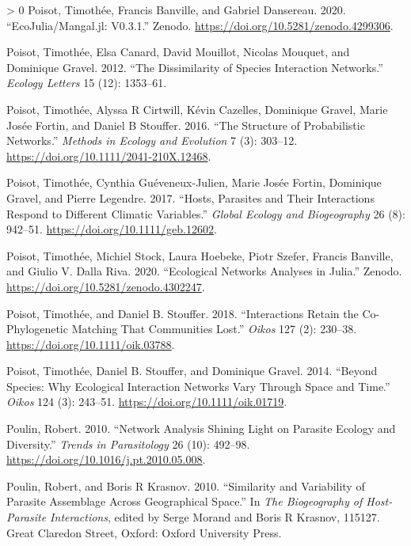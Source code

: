 \documentclass[11pt]{article}
\newlength{\cslhangindent}
\newenvironment{CSLReferences}[3] %
 {%
  \setlength{\parindent}{0pt}
  \ifodd #1 \everypar{\setlength{\hangindent}{\cslhangindent}}\ignorespaces\fi
  \ifnum #2 > 0
  \setlength{\parskip}{#2\baselineskip}
  \fi
 }%
 {}
\begin{document}
\begin{CSLReferences}{1}{0}
\leavevmode\hypertarget{ref-Poisot2020EcoMan}{}%
Poisot, Timothée, Francis Banville, and Gabriel Dansereau. 2020.
{``EcoJulia/Mangal.jl: V0.3.1.''} Zenodo.
\url{https://doi.org/10.5281/zenodo.4299306}.

\leavevmode\hypertarget{ref-Poisot2012DisSpe}{}%
Poisot, Timothée, Elsa Canard, David Mouillot, Nicolas Mouquet, and
Dominique Gravel. 2012. {``The Dissimilarity of Species Interaction
Networks.''} \emph{Ecology Letters} 15 (12): 1353--61.

\leavevmode\hypertarget{ref-Poisot2016StrPro}{}%
Poisot, Timothée, Alyssa R Cirtwill, Kévin Cazelles, Dominique Gravel,
Marie Josée Fortin, and Daniel B Stouffer. 2016. {``The Structure of
Probabilistic Networks.''} \emph{Methods in Ecology and Evolution} 7
(3): 303--12. \url{https://doi.org/10.1111/2041-210X.12468}.

\leavevmode\hypertarget{ref-Poisot2017HosPar}{}%
Poisot, Timothée, Cynthia Guéveneux-Julien, Marie Josée Fortin,
Dominique Gravel, and Pierre Legendre. 2017. {``Hosts, Parasites and
Their Interactions Respond to Different Climatic Variables.''}
\emph{Global Ecology and Biogeography} 26 (8): 942--51.
\url{https://doi.org/10.1111/geb.12602}.

\leavevmode\hypertarget{ref-Poisot2020EcoNet}{}%
Poisot, Timothée, Michiel Stock, Laura Hoebeke, Piotr Szefer, Francis
Banville, and Giulio V. Dalla Riva. 2020. {``Ecological Networks
Analyses in Julia.''} Zenodo.
\url{https://doi.org/10.5281/zenodo.4302247}.

\leavevmode\hypertarget{ref-Poisot2018IntRet}{}%
Poisot, Timothée, and Daniel B. Stouffer. 2018. {``Interactions Retain
the Co-Phylogenetic Matching That Communities Lost.''} \emph{Oikos} 127
(2): 230--38. \url{https://doi.org/10.1111/oik.03788}.

\leavevmode\hypertarget{ref-Poisot2014SpeWhy}{}%
Poisot, Timothée, Daniel B. Stouffer, and Dominique Gravel. 2014.
{``Beyond Species: Why Ecological Interaction Networks Vary Through
Space and Time.''} \emph{Oikos} 124 (3): 243--51.
\url{https://doi.org/10.1111/oik.01719}.

\leavevmode\hypertarget{ref-Poulin2010NetAna}{}%
Poulin, Robert. 2010. {``Network Analysis Shining Light on Parasite
Ecology and Diversity.''} \emph{Trends in Parasitology} 26 (10):
492--98. \url{https://doi.org/10.1016/j.pt.2010.05.008}.

\leavevmode\hypertarget{ref-Poulin2010SimVar}{}%
Poulin, Robert, and Boris R Krasnov. 2010. {``Similarity and Variability
of Parasite Assemblage Across Geographical Space.''} In \emph{The
Biogeography of Host-Parasite Interactions}, edited by Serge Morand and
Boris R Krasnov, 115127. Great Claredon Street, Oxford: Oxford
University Press.


\end{CSLReferences}
\end{document}
